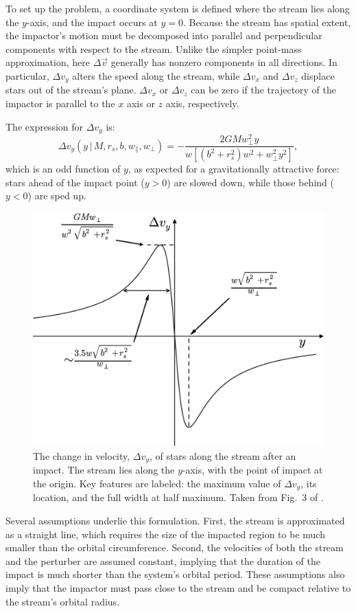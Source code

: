             To set up the problem, a coordinate system is defined where the stream lies along the $y$-axis, and the impact occurs at $y=0$. Because the stream has spatial extent, the impactor's motion must be decomposed into parallel and perpendicular components with respect to the stream. Unlike the simpler point-mass approximation, here $\Delta \vec{v}$ generally has nonzero components in all directions. In particular, $\Delta v_y$ alters the speed along the stream, while $\Delta v_x$ and $\Delta v_z$ displace stars out of the stream's plane. $\Delta v_x$ or $\Delta v_z$ can be zero if the trajectory of the impactor is parallel to the $x$ axis or $z$ axis, respectively. 

            The expression for $\Delta v_y$ is:
            \[
            \Delta v_y\left(y\,|\, M, r_s, b, w_\parallel, w_\perp\right) = - \frac{2GM w_\perp^2 y}{w\left[\left(b^2 + r_s^2\right)w^2 + w_\perp^2 y^2\right]},
            \]
            which is an odd function of $y$, as expected for a gravitationally attractive force: stars ahead of the impact point ($y>0$) are slowed down, while those behind ($y<0$) are sped up.

            \begin{figure}
                \centering
                \includegraphics[width=0.5\linewidth]{images/erkal_et_al_2015_fig_3.png}
                \caption{The change in velocity, $\Delta v_y$, of stars along the stream after an impact. The stream lies along the $y$-axis, with the point of impact at the origin. Key features are labeled: the maximum value of $\Delta v_y$, its location, and the full width at half maximum. Taken from Fig.~3 of \citet{2015MNRAS.450.1136E}.}
                \label{fig:erkal_2015_fig_3}
            \end{figure}

            Several assumptions underlie this formulation. First, the stream is approximated as a straight line, which requires the size of the impacted region to be much smaller than the orbital circumference. Second, the velocities of both the stream and the perturber are assumed constant, implying that the duration of the impact is much shorter than the system's orbital period. These assumptions also imply that the impactor must pass close to the stream and be compact relative to the stream's orbital radius.

